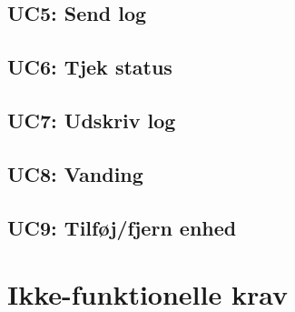 
\subsection{UC5: Send log}



\subsection{UC6: Tjek status}



\subsection{UC7: Udskriv log}



\subsection{UC8: Vanding}



\subsection{UC9: Tilføj/fjern enhed}



%


\section{Ikke-funktionelle krav}
